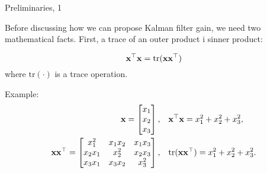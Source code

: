 \documentclass{beamer}
\begin{document}
\begin{frame}
	\begin{flushleft}
		
		
	\end{flushleft}
\end{frame}


\begin{frame}{Preliminaries, 1}
	\begin{flushleft}
		
		Before discussing how we can propose Kalman filter gain, we need two mathematical facts. First, a trace of an outer product i sinner product:
		
		\begin{equation}
			\mathbf{x}^\top \mathbf{x} = \text{tr}(\mathbf{x}\mathbf{x}^\top)
		\end{equation}
		where $\text{tr}(\cdot)$ is a trace operation.
	
	\bigskip
	
		Example:
		\begin{align*}
			\bo{x} = 
			\begin{bmatrix}
				x_1 \\ x_2 \\ x_3
			\end{bmatrix},& 
		\ \ \ 
		\bo{x}\T \bo{x} = x_1^2+x_2^2+x_3^2, 
		\\
		\bo{x}\bo{x}\T = 
		\begin{bmatrix}
			x_1^2    & x_1 x_2 & x_1 x_3 \\ 
			x_2 x_1 & x_2^2    & x_2 x_3 \\ 
			x_3 x_1 & x_3 x_2 & x_3^2
		\end{bmatrix},& 
	\ \ \
	\text{tr}(\bo{x}\bo{x}\T)  = x_1^2+x_2^2+x_3^2.
		\end{align*}	
	
	\end{flushleft}
\end{frame}
\end{document}
